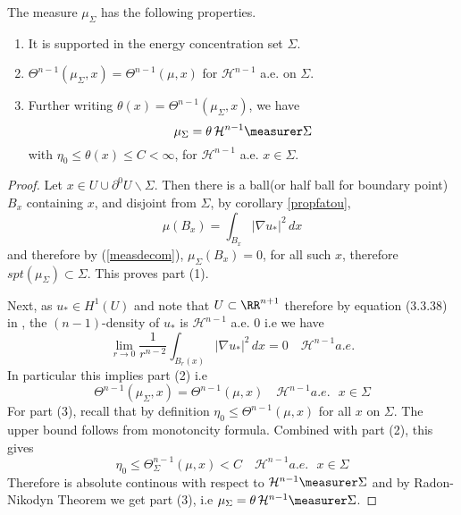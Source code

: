 \begin{theo}\label{thm:sing}
    The measure $\mu_{\Sigma}$ has the following properties. 
    \begin{enumerate}
        \item It is supported in the energy concentration set $\Sigma$.
        \item $\Theta^{n-1}(\mu_{\Sigma},x)=\Theta^{n-1}(\mu, x)$ for $\mathcal{H}^{n-1}$ a.e. on $\Sigma$. 
        \item Further writing $\theta(x) = \Theta^{n-1}(\mu_{\Sigma},x)$, we have  $$\mu_{\Sigma}=\theta \, \mathcal{H}^{n-1}\measurer \Sigma$$ with $\eta_0 \leq \theta(x) \leq C < \infty$, for $\mathcal{H}^{n-1}$ a.e. $x \in \Sigma$.
    \end{enumerate}
    
     
\end{theo}
\begin{proof}
Let $x \in U \cup \partial^0U \backslash \Sigma$. Then there is a ball(or half ball for boundary point) $B_x$ containing $x$, and disjoint from $\Sigma$, by corollary \ref{propfatou}, $$\mu(B_x)= \int_{B_x} |\nabla u_*|^2 \,dx$$
and therefore by (\ref{measdecom}), $\mu_{\Sigma}(B_x)=0$, for all such $x$, therefore $spt(\mu_{\Sigma}) \subset \Sigma$. This proves part (1). 

Next, as $u_* \in H^1(U)$ and note that $U \subset \RR^{n+1}$ therefore by equation (3.3.38) in \cite{z}, the $(n-1)$-density of $u_*$ is $\mathcal{H}^{n-1}$ a.e. $0$ i.e we have $$ \lim _{r \to 0}\frac{1}{r^{n-2}}\int_{B_r(x)} |\nabla u_*|^2\,dx = 0 \quad \mathcal{H}^{n-1} a.e. $$
In particular this implies part (2) i.e 
$$\Theta^{n-1}(\mu_{\Sigma},x)=\Theta^{n-1}(\mu, x)  \quad \mathcal{H}^{n-1} a.e. \text{ } x \in \Sigma $$
For part (3), recall that by definition $\eta_0 \leq \Theta^{n-1}(\mu, x)$ for all $x$ on $\Sigma$. The upper bound follows from monotoncity formula. Combined with part (2), this gives 
$$\eta_0 \leq \Theta_{\Sigma}^{n-1}(\mu, x) < C \quad \mathcal{H}^{n-1} a.e. \text{ } x\in \Sigma  $$
Therefore is absolute continous with respect to $\mathcal{H}^{n-1}\measurer \Sigma$ and by Radon-Nikodyn Theorem we get part (3), i.e  $\mu_{\Sigma} = \theta \, \mathcal{H}^{n-1}\measurer \Sigma$.
\end{proof}










